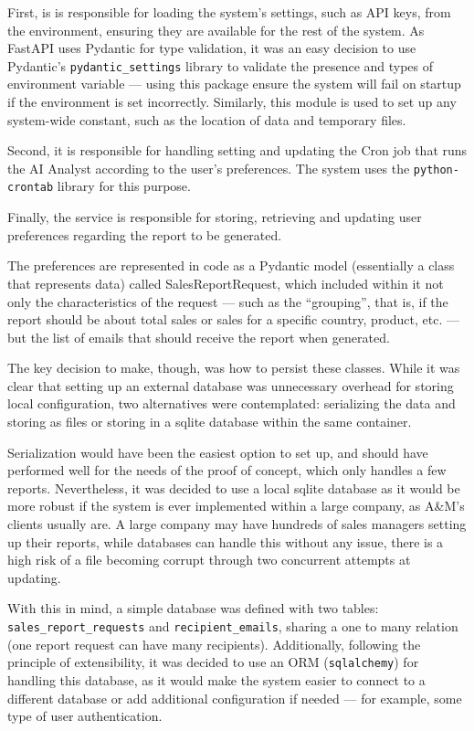 \documentclass[a4paper]{report}
\begin{document}
First, is is responsible for loading the system's settings, such as API keys, from the environment, ensuring they are available for the rest of the system. As FastAPI uses Pydantic for type validation, it was an easy decision to use Pydantic's \texttt{pydantic\_settings} library to validate the presence and types of environment variable --- using this package ensure the system will fail on startup if the environment is set incorrectly. Similarly, this module is used to set up any system-wide constant, such as the location of data and temporary files.

Second, it is responsible for handling setting and updating the Cron job that runs the AI Analyst according to the user's preferences. The system uses the \texttt{python-crontab} library for this purpose.

Finally, the service is responsible for storing, retrieving and updating user preferences regarding the report to be generated.

The preferences are represented in code as a Pydantic model (essentially a class that represents data) called SalesReportRequest, which included within it not only the characteristics of the request --- such as the ``grouping'', that is, if the report should be about total sales or sales for a specific country, product, etc. --- but the list of emails that should receive the report when generated.

The key decision to make, though, was how to persist these classes. While it was clear that setting up an external database was unnecessary overhead for storing local configuration, two alternatives were contemplated: serializing the data and storing as files or storing in a sqlite database within the same container.

Serialization would have been the easiest option to set up, and should have performed well for the needs of the proof of concept, which only handles a few reports. Nevertheless, it was decided to use a local sqlite database as it would be more robust if the system is ever implemented within a large company, as A\&M's clients usually are. A large company may have hundreds of sales managers setting up their reports, while databases can handle this without any issue, there is a high risk of a file becoming corrupt through two concurrent attempts at updating.

With this in mind, a simple database was defined with two tables: \texttt{sales\_report\_requests} and \texttt{recipient\_emails}, sharing a one to many relation (one report request can have many recipients). Additionally, following the principle of extensibility, it was decided to use an ORM (\texttt{sqlalchemy}) for handling this database, as it would make the system easier to connect to a different database or add additional configuration if needed --- for example, some type of user authentication.
\end{document}
